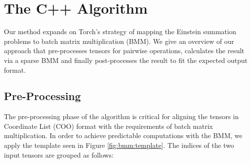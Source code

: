 \section{The C++ Algorithm}
Our method expands on Torch's strategy of mapping the Einstein summation problems to batch matrix
multiplication (BMM). We give an overview of our approach that pre-processes tensors for pairwise
operations, calculates the result via a sparse BMM and finally post-processes the result to fit the
expected output format.

\subsection{Pre-Processing}
The pre-processing phase of the algorithm is critical for aligning the tensors in Coordinate List
(COO) format with the requirements of batch matrix multiplication. In order to achieve predictable
computations with the BMM, we apply the template seen in Figure \ref{fig:bmm:template}. The indices
of the two input tensors are grouped as follows:

